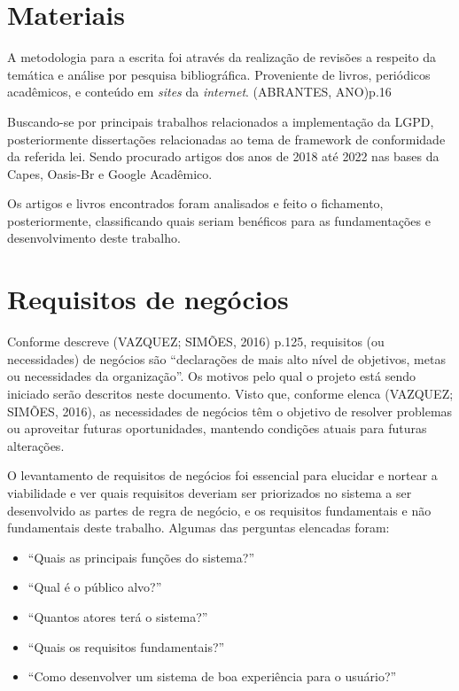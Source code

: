 \documentclass[
	12pt,				%
	openright,			%
	oneside,			%
	a4paper,			%
	english,			%
	french,				%
	spanish,			%
	brazil,				%
	]{abntex2}
\begin{document}
\section{Materiais}

A metodologia para a escrita foi através da realização de revisões a respeito da temática e análise por pesquisa bibliográfica. Proveniente de livros, periódicos acadêmicos, e conteúdo em \textit{sites} da \textit{internet}. (ABRANTES, ANO)p.16

Buscando-se por principais trabalhos relacionados a implementação da LGPD, posteriormente dissertações relacionadas ao tema de framework de conformidade da referida lei. Sendo procurado artigos dos anos de 2018 até 2022 nas bases da Capes, Oasis-Br e Google Acadêmico. 

Os artigos e livros encontrados foram analisados e feito o fichamento, posteriormente, classificando quais seriam benéficos para as fundamentações e desenvolvimento deste trabalho.

\section{Requisitos de negócios}

Conforme descreve (VAZQUEZ; SIMÕES, 2016) p.125, requisitos (ou necessidades) de negócios são “declarações de mais alto nível de objetivos, metas ou necessidades da organização”.  Os motivos pelo qual o projeto está sendo iniciado serão descritos neste documento. Visto que, conforme elenca   (VAZQUEZ; SIMÕES, 2016), as necessidades de negócios têm o objetivo de resolver problemas ou aproveitar futuras oportunidades, mantendo condições atuais para futuras alterações.

O levantamento de requisitos de negócios foi essencial para elucidar e nortear a viabilidade e ver quais requisitos deveriam ser priorizados no sistema a ser desenvolvido as partes de regra de negócio, e os requisitos fundamentais e não fundamentais deste trabalho. Algumas das perguntas elencadas foram:

\begin{itemize}
\item “Quais as principais funções do sistema?”
\item “Qual é o público alvo?”
\item “Quantos atores terá o sistema?”
\item “Quais os requisitos fundamentais?”
\item “Como desenvolver um sistema de boa experiência para o usuário?”
\end{itemize}
\end{document}
